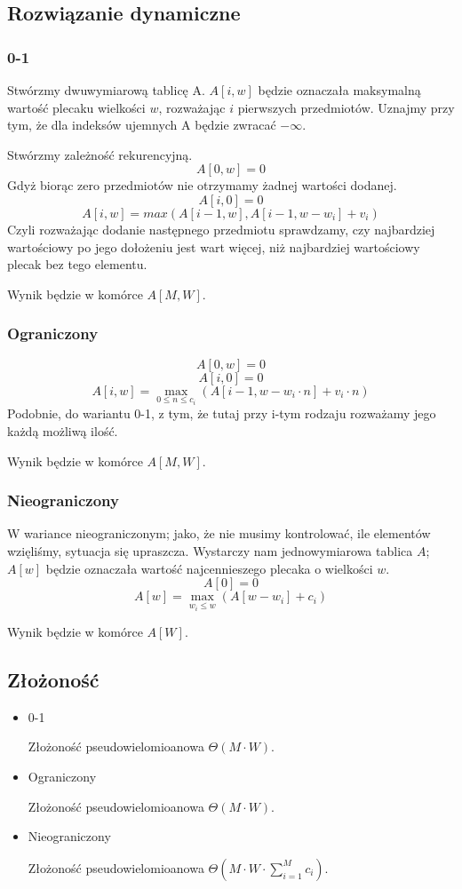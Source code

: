 \subsection{Rozwiązanie dynamiczne}
\subsubsection{0-1}
Stwórzmy dwuwymiarową tablicę A.
$A[i, w]$ będzie oznaczała maksymalną wartość plecaku wielkości $w$, rozważając $i$ pierwszych przedmiotów.
Uznajmy przy tym, że dla indeksów ujemnych A będzie zwracać $-\infty$.

Stwórzmy zależność rekurencyjną.
\[A[0, w] = 0\]
Gdyż biorąc zero przedmiotów nie otrzymamy żadnej wartości dodanej.
\[A[i, 0] = 0\]
\[A[i, w] = max(A[i - 1, w], A[i - 1, w - w_i] + v_i)\]
Czyli rozważając dodanie następnego przedmiotu sprawdzamy, czy najbardziej wartościowy po jego dołożeniu jest wart więcej, niż najbardziej wartościowy plecak bez tego elementu.

Wynik będzie w komórce $A[M, W]$.

\subsubsection{Ograniczony}
\[A[0, w] = 0\]
\[A[i, 0] = 0\]
\[A[i, w] = \max_{0 \leq n \leq c_i}(A[i - 1, w - w_i \cdot n] + v_i \cdot n)\]
Podobnie, do wariantu 0-1, z tym, że tutaj przy i-tym rodzaju rozważamy jego każdą możliwą ilość.

Wynik będzie w komórce $A[M, W]$.

\subsubsection{Nieograniczony}
W wariance nieograniczonym; jako, że nie musimy kontrolować, ile elementów wzięliśmy, sytuacja się upraszcza.
Wystarczy nam jednowymiarowa tablica $A$; $A[w]$ będzie oznaczała wartość najcennieszego plecaka o wielkości $w$.
\[A[0] = 0\]
\[A[w] = \max_{w_i \le w}(A[w - w_i] + c_i) \]

Wynik będzie w komórce $A[W]$.

\subsection{Złożoność}
\begin{itemize}
  \item 0-1

  Złożoność pseudowielomioanowa $\Theta(M \cdot W)$.
  \item Ograniczony

  Złożoność pseudowielomioanowa $\Theta(M \cdot W)$.
  \item Nieograniczony

    Złożoność pseudowielomioanowa $\Theta(M \cdot W \cdot \sum_{i=1}^{M} c_i)$.
\end{itemize}
